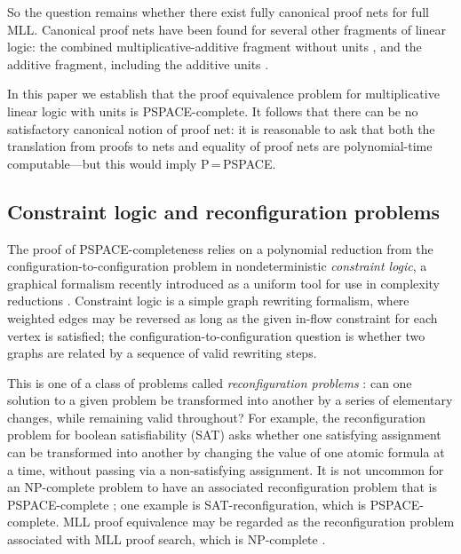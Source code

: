 \documentclass{sigplanconf-modified}
\let\aftersubsection=\noindent
\let\capsabbrev=\uppercase
\begin{document}
So the question remains whether there exist fully canonical proof nets for full \capsabbrev{mll}. Canonical proof nets have been found for several other fragments of linear logic: the combined multiplicative-additive fragment without units \cite{Hughes-vanGlabbeek-2005}, and the additive fragment, including the additive units \cite{Heijltjes-2011}.

In this paper we establish that the proof equivalence problem for multiplicative linear logic with units is \capsabbrev{pspace}-complete. It follows that there can be no satisfactory canonical notion of proof net: 
\color{red}
it is reasonable to ask that both the translation from proofs to nets and equality of proof nets are polynomial-time computable---but this would imply \capsabbrev{p}\,=\,\capsabbrev{pspace}.
\color{black}



\subsection*{Constraint logic and reconfiguration problems}

\aftersubsection
The proof of \capsabbrev{pspace}-completeness relies on a polynomial reduction from the configuration-to-configuration problem in nondeterministic
\emph{constraint logic}, a graphical formalism recently introduced as a uniform tool for use in complexity reductions \cite{Demaine-Hearn-2008}.
%
Constraint logic is a simple graph rewriting formalism, where weighted edges may be reversed as long as the given in-flow constraint for each vertex is satisfied; the configuration-to-configuration question is whether two graphs are related by a sequence of valid rewriting steps.

This is one of a class of problems called \emph{reconfiguration problems} \cite{ReconfigurationProblems}: can one solution to a given problem be transformed into another by a series of elementary changes, while remaining valid throughout?
%
For example, the reconfiguration problem for boolean satisfiability (SAT) asks whether one satisfying assignment can be transformed into another by changing the value of one atomic formula at a time, without passing via a non-satisfying assignment.
%
It is not uncommon for an \capsabbrev{np}-complete problem to have an associated reconfiguration problem that is \capsabbrev{pspace}-complete \cite{ReconfigurationProblems}; one example is SAT-reconfiguration, which is \capsabbrev{pspace}-complete. \capsabbrev{mll} proof equivalence may be regarded as the reconfiguration problem associated with \capsabbrev{mll} proof search, which is \capsabbrev{np}-complete \cite{Kanovich-1992,Lincoln-Winkler-1994}.
\end{document}
